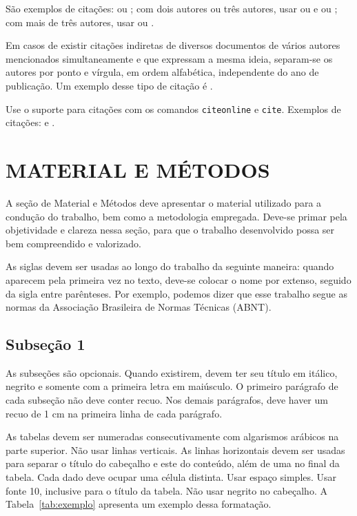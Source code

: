 \documentclass[brazil,12pt]{article}
\begin{document}
São exemplos de citações:  ou \cite{Koh95}; com dois
autores ou três autores, usar  ou \cite{Alm94}
e  ou \cite{Bra07}; com mais de três autores, usar
 ou \cite{CSRL2001}. 

Em casos de existir citações indiretas de diversos documentos de
vários autores mencionados simultaneamente e que expressam a mesma
ideia, separam-se os autores por ponto e vírgula, em ordem alfabética,
independente do ano de publicação. Um exemplo desse tipo de citação é
\cite{Alm94,Koh95}.

Use o suporte \BibTeX para citações com os comandos
\texttt{citeonline} e \texttt{cite}. Exemplos de citações:
\cite{Bra07} e . 

\section*{MATERIAL E MÉTODOS}
A seção de Material e Métodos  deve apresentar o material utilizado
para a condução do trabalho, bem como a metodologia empregada. Deve-se
primar pela objetividade e clareza nessa seção, para que o trabalho
desenvolvido possa ser bem compreendido e valorizado. 

As siglas devem ser usadas ao longo do trabalho da seguinte maneira:
quando aparecem pela primeira vez no texto, deve-se colocar o nome por
extenso, seguido da sigla entre parênteses. Por exemplo, podemos dizer
que esse trabalho segue as normas da Associação Brasileira de Normas
Técnicas (ABNT). 

\subsection*{Subseção 1} 
As subseções são opcionais. Quando existirem, devem ter seu título em
itálico, negrito e somente com a primeira letra em maiúsculo. O
primeiro parágrafo de cada subseção não deve conter recuo. Nos demais
parágrafos, deve haver um recuo de 1 cm na primeira linha de cada
parágrafo. 

As tabelas devem ser numeradas consecutivamente com algarismos
arábicos na parte superior. Não usar linhas verticais. As linhas
horizontais devem ser usadas para separar o título do cabeçalho e este
do conteúdo, além de uma no final da tabela. Cada dado deve ocupar uma
célula distinta. Usar espaço simples. Usar fonte 10, inclusive para o
título da tabela. Não usar negrito no cabeçalho. A
Tabela~\ref{tab:exemplo} apresenta um exemplo dessa formatação. 
\end{document}
